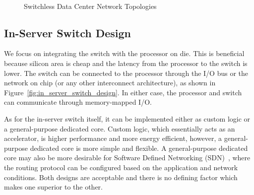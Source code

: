 
\begin{figure}
    \centering
    \\
    \vspace{-0.05in}
    \vspace{-0.07in}
    \caption{Switchless Data Center Network Topologies}
    \label{fig:switchless_topos}
\end{figure}

\subsection{In-Server Switch Design}

We focus on integrating the switch with the processor on die.  This is beneficial because silicon area is cheap and the latency from the processor to the switch is lower.  The switch can be connected to the processor through the I/O bus or the network on chip (or any other interconnect architecture), as shown in Figure~\ref{fig:in_server_switch_design}.  In either case, the processor and switch can communicate through memory-mapped I/O.  

As for the in-server switch itself, it can be implemented either as custom logic or a general-purpose dedicated core.  Custom logic, which essentially acts as an accelerator, is higher performance and more energy efficient, however, a general-purpose dedicated core is more simple and flexible.  A general-purpose dedicated core may also be more desirable for Software Defined Networking (SDN)~\cite{Kim:2013:INMSDN,Staessens:2011:SDNMCGR,Goth:2011:SDNCSUMP}, where the routing protocol can be configured based on the application and network conditions.  Both designs are acceptable and there is no defining factor which makes one superior to the other.

